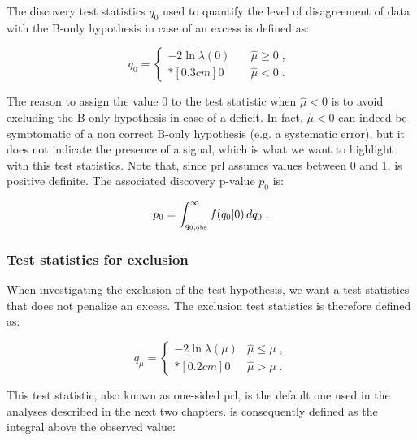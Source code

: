 The discovery test statistics $q_{0}$ used to quantify the level of disagreement of data with the B-only hypothesis in case of an excess is defined as:

\begin{equation}
\label{eq:stat:q0}
q_{0} =
\left\{ \! \! \begin{array}{ll}
               - 2 \ln \lambda(0)
               & \quad \hat{\mu} \ge 0 \;, \\*[0.3 cm]
               0 & \quad \hat{\mu} < 0  \;.
              \end{array} \; \right.
\end{equation}
 
\noindent The reason to assign the value 0 to the test statistic when $\hat{\mu} < 0$ is to avoid excluding the B-only hypothesis in case of a deficit. In fact, $\hat{\mu} < 0$ can indeed be symptomatic of a non correct B-only hypothesis (e.g. a systematic error), but it does not indicate the presence of a signal, which is what we want to highlight with this test statistics. Note that, since \gls{prl} assumes values between 0 and 1, \qzero is positive definite. The associated discovery p-value $p_{0}$ is:

\begin{equation}
\label{eq:stat:p0}
p_{0} = \int_{q_{0,{\rm obs}}}^{\infty} f(q_{0} | 0 ) \, d q_{0} \; .
\end{equation}

\subsubsection*{Test statistics for exclusion}

When investigating the exclusion of the test hypothesis, we want a test statistics that does not penalize an excess. The exclusion test statistics \qmu is therefore defined as:

\begin{equation}
\label{eq:stat:qmu}
q_{\mu} =
\left\{ \! \! \begin{array}{ll}
               - 2 \ln \lambda(\mu)  & \hat{\mu} \le \mu  \;, \\*[0.2 cm]
               0 & \hat{\mu} > \mu \;.
              \end{array}
       \right.
\end{equation}

\noindent This test statistic, also known as one-sided \gls{prl}, is the default one used in the analyses described in the next two chapters. \pmu is consequently defined as the integral above the observed value: 

